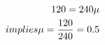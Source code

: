 \documentclass[preview]{standalone}
\begin{document}
\begin{align*}
\special{dvisvgm:raw <g id='unique000'>}120 = 240\mu \\implies \mu = \frac{120}{240} = 0.5\special{dvisvgm:raw </g>}
\end{align*}
\end{document}
